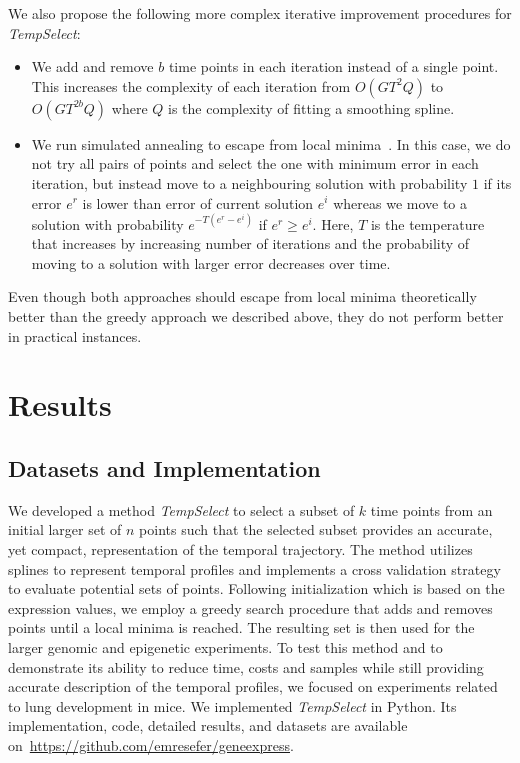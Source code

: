 \documentclass[10pt]{article}
\newcommand{\Tempselect}{\textit{TempSelect}\xspace}
\begin{document}
We also propose the following more complex iterative improvement procedures for
\Tempselect:

\begin{itemize}
\item We add and remove $b$ time points in each iteration instead of a single point. This increases the complexity of each
  iteration from $O(GT^{2}Q)$ to $O(GT^{2b}Q)$ where $Q$ is
  the complexity of fitting a smoothing spline.

\item We run simulated annealing to escape from local
  minima~\cite{kirkpatrick1983}. In this case, we do not try all
  pairs of points and select the one with minimum error in each
  iteration, but instead move to a neighbouring solution with probability $1$ if
  its error $e^{r}$ is lower than error of current solution $e^{i}$ whereas we move to a solution with probability
  $e^{-T(e^{r}-e^{i})}$ if $e^{r} \ge e^{i}$. Here, $T$ is the temperature that increases by
  increasing number of iterations and the probability of moving to a solution
  with larger error decreases over time.
\end{itemize}

Even though both approaches should escape from local minima theoretically better than
the greedy approach we described above, they do not perform
better in practical instances.

\section{Results}

\subsection{Datasets and Implementation}

We developed a method \Tempselect to select a subset of $k$ time points from an
initial larger set of $n$ points such that the selected subset provides an accurate, yet compact, representation of the temporal
trajectory. The method utilizes splines to represent temporal profiles and implements a cross
validation strategy to evaluate potential sets of points. Following
initialization which is based on the expression values, we employ a
greedy search procedure that adds and removes points until a local minima is reached. The resulting
set is then used for the larger genomic and epigenetic experiments. To test this method and to demonstrate its ability to reduce time,
costs and samples while still providing accurate description of the
temporal profiles, we focused on experiments related to lung
development in mice. We implemented \Tempselect in Python. Its implementation, code, detailed results, and datasets are available
on~\url{https://github.com/emresefer/geneexpress}. 
\end{document}
